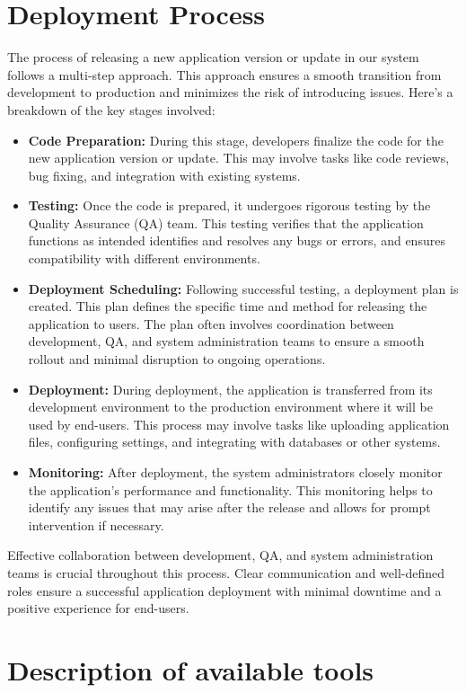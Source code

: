 \section{Deployment Process}
The process of releasing a new application version or update in our system follows a multi-step approach. This approach ensures a smooth transition from development to production and minimizes the risk of introducing issues.
Here's a breakdown of the key stages involved:
\begin{itemize}
    \item \textbf{Code Preparation:} During this stage, developers finalize the code for the new application version or update. This may involve tasks like code reviews, bug fixing, and integration with existing systems.
    \item \textbf{Testing:} Once the code is prepared, it undergoes rigorous testing by the Quality Assurance (QA) team. This testing verifies that the application functions as intended identifies and resolves any bugs or errors, and ensures compatibility with different environments.
    \item \textbf{Deployment Scheduling:} Following successful testing, a deployment plan is created. This plan defines the specific time and method for releasing the application to users. The plan often involves coordination between development, QA, and system administration teams to ensure a smooth rollout and minimal disruption to ongoing operations.
    \item \textbf{Deployment:} During deployment, the application is transferred from its development environment to the production environment where it will be used by end-users. This process may involve tasks like uploading application files, configuring settings, and integrating with databases or other systems.
    \item \textbf{Monitoring:} After deployment, the system administrators closely monitor the application's performance and functionality. This monitoring helps to identify any issues that may arise after the release and allows for prompt intervention if necessary.
\end{itemize}
Effective collaboration between development, QA, and system administration teams is crucial throughout this process. Clear communication and well-defined roles ensure a successful application deployment with minimal downtime and a positive experience for end-users.
\section{Description of available tools}
